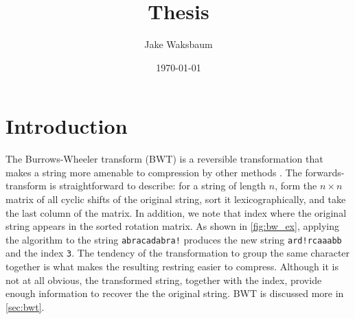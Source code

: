 \documentclass[11pt]{article}
\author{Jake Waksbaum}
\date{\today}
\title{Thesis}
\begin{document}
\maketitle
\tableofcontents

\section{Introduction}
\label{sec:intro}

The Burrows-Wheeler transform (BWT) is a reversible transformation
that makes a string more amenable to compression by other
methods \cite{bw}. The forwards-transform is straightforward to
describe: for a string of length \(n\), form the \(n \times n\) matrix of
all cyclic shifts of the original string, sort it lexicographically,
and take the last column of the matrix. In addition, we note that
index where the original string appears in the sorted rotation matrix.
As shown in \autoref{fig:bw_ex}, applying the algorithm to the string
\verb|abracadabra!| produces the new string \verb|ard!rcaaabb| and the
index \verb|3|. The tendency of the transformation to group the same
character together is what makes the resulting restring easier to
compress. Although it is not at all obvious, the transformed string,
together with the index, provide enough information to recover the the
original string. BWT is discussed more in \autoref{sec:bwt}.
\end{document}
